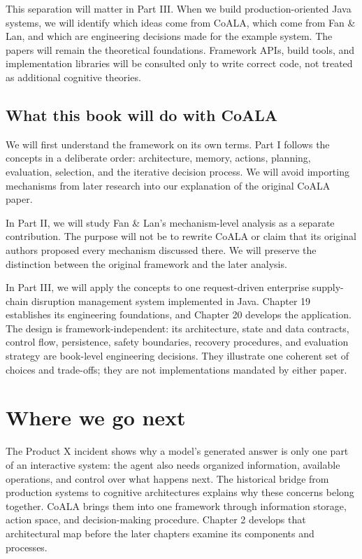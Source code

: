 This separation will matter in Part III. When we build production-oriented Java systems, we will identify which ideas come from CoALA, which come from Fan \& Lan, and which are engineering decisions made for the example system. The papers will remain the theoretical foundations. Framework APIs, build tools, and implementation libraries will be consulted only to write correct code, not treated as additional cognitive theories.

\subsection{What this book will do with CoALA}\label{what-this-book-will-do-with-coala}

We will first understand the framework on its own terms. Part I follows the concepts in a deliberate order: architecture, memory, actions, planning, evaluation, selection, and the iterative decision process. We will avoid importing mechanisms from later research into our explanation of the original CoALA paper.

In Part II, we will study Fan \& Lan's mechanism-level analysis as a separate contribution. The purpose will not be to rewrite CoALA or claim that its original authors proposed every mechanism discussed there. We will preserve the distinction between the original framework and the later analysis.

In Part III, we will apply the concepts to one request-driven enterprise supply-chain disruption management system implemented in Java. Chapter 19 establishes its engineering foundations, and Chapter 20 develops the application. The design is framework-independent: its architecture, state and data contracts, control flow, persistence, safety boundaries, recovery procedures, and evaluation strategy are book-level engineering decisions. They illustrate one coherent set of choices and trade-offs; they are not implementations mandated by either paper.

\section{Where we go next}\label{where-we-go-next}

The Product X incident shows why a model's generated answer is only one part of an interactive system: the agent also needs organized information, available operations, and control over what happens next. The historical bridge from production systems to cognitive architectures explains why these concerns belong together. CoALA brings them into one framework through information storage, action space, and decision-making procedure. Chapter 2 develops that architectural map before the later chapters examine its components and processes.

